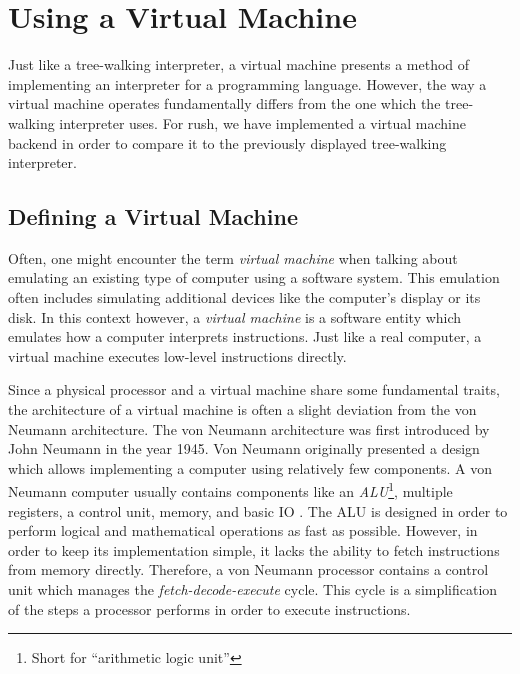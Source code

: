 \section{Using a Virtual Machine}

Just like a tree-walking interpreter, a virtual machine presents a method of implementing an interpreter for a programming language.
However, the way a virtual machine operates fundamentally differs from the one which the tree-walking interpreter uses.
For rush, we have implemented a virtual machine backend in order to compare it to the previously displayed tree-walking interpreter.

\subsection{Defining a Virtual Machine}

Often, one might encounter the term \emph{virtual machine} when talking about emulating an existing type of computer using a software system.
This emulation often includes simulating additional devices like the computer's display or its disk.
In this context however, a \emph{virtual machine} is a software entity which emulates how a computer interprets instructions.
Just like a real computer, a virtual machine executes low-level instructions directly.

Since a physical processor and a virtual machine share some fundamental traits,
the architecture of a virtual machine is often a slight deviation from the von Neumann architecture.
The von Neumann architecture was first introduced by John Neumann in the year 1945.
Von Neumann originally presented a design which allows implementing a computer using relatively few components.
A von Neumann computer usually contains components like an \emph{ALU}\footnote{Short for \enquote{arithmetic logic unit}}, multiple registers, a control unit, memory, and basic IO \cite[p.~172]{Ledin2020-yp}.
The ALU is designed in order to perform logical and mathematical operations as fast as possible.
However, in order to keep its implementation simple, it lacks the ability to fetch instructions from memory directly.
Therefore, a von Neumann processor contains a control unit which manages the \emph{fetch-decode-execute} cycle.
This cycle is a simplification of the steps a processor performs in order to execute instructions.

